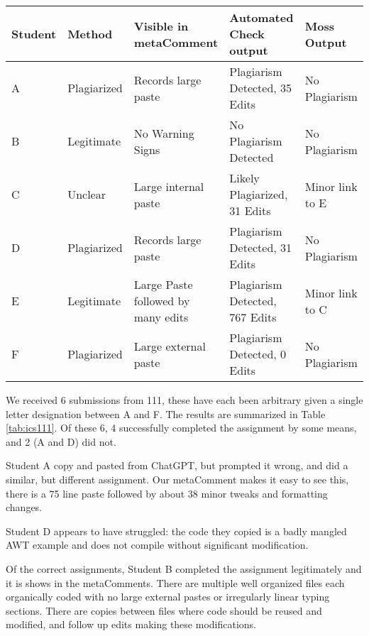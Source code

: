 \documentclass[letterpaper,10pt,conference]{IEEEtran}
\newcommand{\metaComment}{metaComment\xspace}
\begin{document}
\begin{table*}[thb]
    \centering
    \caption{ICS 111 Case study}
    \label{tab:ics111}
    \begin{tabular}{|l|l|l|l|l|}
        \hline
        Student & Method & Visible in \metaComment & Automated Check output & Moss Output \\
        \hline
        A & Plagiarized & Records large paste & Plagiarism Detected, 35 Edits & No Plagiarism \\\rowcolor{Gray}
        B & Legitimate & No Warning Signs & No Plagiarism Detected & No Plagiarism \\
        C & Unclear & Large internal paste & Likely Plagiarized, 31 Edits & Minor link to E \\\rowcolor{Gray}
        D & Plagiarized& Records large paste & Plagiarism Detected, 31 Edits & No Plagiarism \\
        E & Legitimate & Large Paste followed by many edits & Plagiarism Detected, 767 Edits & Minor link to C \\\rowcolor{Gray}
        F & Plagiarized & Large external paste & Plagiarism Detected, 0 Edits & No Plagiarism \\
        \hline
    \end{tabular}
\end{table*}


We received 6 submissions from 111, these have each been arbitrary given a single letter designation between A and F.  The results are summarized in Table \ref{tab:ics111}.  Of these 6, 4 successfully completed the assignment by some means, and 2 (A and D) did not.

  Student A copy and pasted from ChatGPT, but prompted it wrong, and did a similar, but different assignment.  Our \metaComment makes it easy to see this, there is a 75 line paste followed by about 38 minor tweaks and formatting changes.

Student D appears to have struggled: the code they copied is a badly mangled AWT example and does not compile without significant modification.

Of the correct assignments, Student B completed the assignment legitimately and it is shows in the \metaComment{}s.  There are multiple well organized files each organically coded with no large external pastes or irregularly linear typing sections.  There are copies between files where code should be reused and modified, and follow up edits making these modifications.
\end{document}
